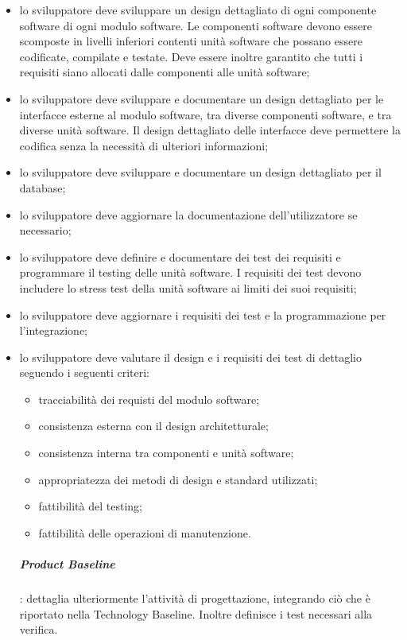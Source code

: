 			\begin{itemize}
			\item lo sviluppatore deve sviluppare un design dettagliato di ogni componente software di ogni modulo software. Le componenti software devono essere scomposte in livelli inferiori contenti unità software che possano essere codificate, compilate e testate. Deve essere inoltre garantito che tutti i requisiti siano allocati dalle componenti alle unità software;
			\item lo sviluppatore deve sviluppare e documentare un design dettagliato per le interfacce esterne al modulo software, tra diverse componenti software, e tra diverse unità software. Il design dettagliato delle interfacce deve permettere la codifica senza la necessità di ulteriori informazioni;
			\item lo sviluppatore deve sviluppare e documentare un design dettagliato per il database;
			\item lo sviluppatore deve aggiornare la documentazione dell'utilizzatore se necessario;
			\item lo sviluppatore deve definire e documentare dei test dei requisiti e programmare il testing delle unità software. I requisiti dei test devono includere lo stress test della unità software ai limiti dei suoi requisiti;
			\item lo sviluppatore deve aggiornare i requisiti dei test e la programmazione per l'integrazione;
			\item lo sviluppatore deve valutare il design e i requisiti dei test di dettaglio seguendo i seguenti criteri:
			\begin{itemize}
			\item tracciabilità dei requisti del modulo software;
			\item consistenza esterna con il design architetturale;
			\item consistenza interna tra componenti e unità software;
			\item appropriatezza dei metodi di design e standard utilizzati;
			\item fattibilità del testing;
			\item fattibilità delle operazioni di manutenzione.
			\end{itemize}
			\subparagraph{Product Baseline}: dettaglia ulteriormente l'attività di progettazione, integrando ciò che è riportato nella Technology Baseline\glo. Inoltre definisce i test necessari alla verifica.\newline \newline

\end{itemize}
